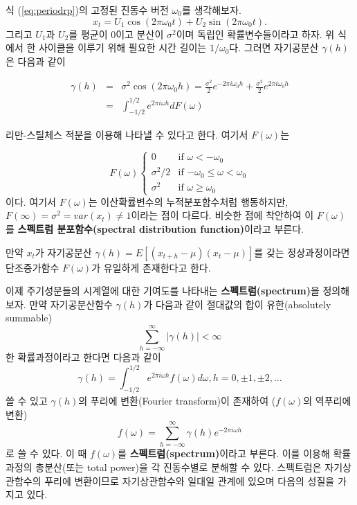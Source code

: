 \documentclass[b5paper,]{scrbook}
\theoremstyle{plain}
\theoremstyle{definition}
\numberwithin{equation}{section}
\begin{document}
식 (\eqref{eq:periodrp})의 고정된 진동수 버전 \(\omega_{0}\)를 생각해보자.
\[x_{t}=U_{1}\cos (2\pi\omega_{0}t) + U_{2}\sin(2\pi\omega_{0}t).\]
그리고 \(U_{1}\)과 \(U_{2}\)를 평균이 0이고 분산이 \(\sigma^{2}\)이며
독립인 확률변수들이라고 하자. 위 식에서 한 사이클을 이루기 위해 필요한
시간 길이는 \(1/\omega_{0}\)다. 그러면 자기공분산 \(\gamma(h)\)은 다음과
같이

\begin{eqnarray*}
\gamma(h)&=&\sigma^{2}\cos (2\pi \omega_{0}h)=\frac{\sigma^{2}}{2}e^{-2\pi i \omega_{0}h}+\frac{\sigma^{2}}{2}e^{2\pi i \omega_{0}h}\\
&=&\int_{-1/2}^{1/2}e^{2\pi i \omega h }dF(\omega)
\end{eqnarray*}

리만-스틸체스 적분을 이용해 나타낼 수 있다고 한다. 여기서
\(F(\omega)\)는

\[
F(\omega) 
\begin{cases}
0 & \text{if $\omega < -\omega_{0}$}\\
\sigma^{2}/2 & \text{if $-\omega_{0} \leq \omega < \omega_{0}$}\\
\sigma^{2} & \text{if $\omega \geq \omega_{0}$}
\end{cases}
\] 이다. 여기서 \(F(\omega)\)는 이산확률변수의 누적분포함수처럼
행동하지만, \(F(\infty)=\sigma^{2}=var(x_{t})\neq 1\)이라는 점이 다르다.
비슷한 점에 착안하여 이 \(F(\omega)\)를 \textbf{스펙트럼
분포함수(spectral distribution function)}이라고 부른다.

만약 \(x_{t}\)가 자기공분산 \(\gamma(h)=E[(x_{t+h}-\mu)(x_{t}-\mu)]\)를
갖는 정상과정이라면 단조증가함수 \(F(\omega)\)가 유일하게 존재한다고
한다.

이제 주기성분들의 시계열에 대한 기여도를 나타내는
\textbf{스펙트럼(spectrum)}을 정의해보자. 만약 자기공분산함수
\(\gamma(h)\)가 다음과 같이 절대값의 합이 유한(absolutely summable)
\[\sum_{h=-\infty}^{\infty}|\gamma(h)|<\infty\] 한 확률과정이라고 한다면
다음과 같이
\[\gamma(h)=\int_{-1/2}^{1/2}e^{2\pi i \omega h }f(\omega)d\omega, h=0,\pm 1, \pm 2,\ldots\]
쓸 수 있고 \(\gamma(h)\)의 푸리에 변환(Fourier transform)이 존재하여
(\(f(\omega)\)의 역푸리에 변환)
\[f(\omega)=\sum_{h=-\infty}^{\infty}\gamma(h)e^{-2\pi i \omega h}\] 로
쓸 수 있다. 이 때 \(f(\omega)\)를 \textbf{스펙트럼(spectrum)}이라고
부른다. 이를 이용해 확률과정의 총분산(또는 total power)을 각 진동수별로
분해할 수 있다. 스펙트럼은 자기상관함수의 푸리에 변환이므로
자기상관함수와 일대일 관계에 있으며 다음의 성질을 가지고 있다.
\end{document}
